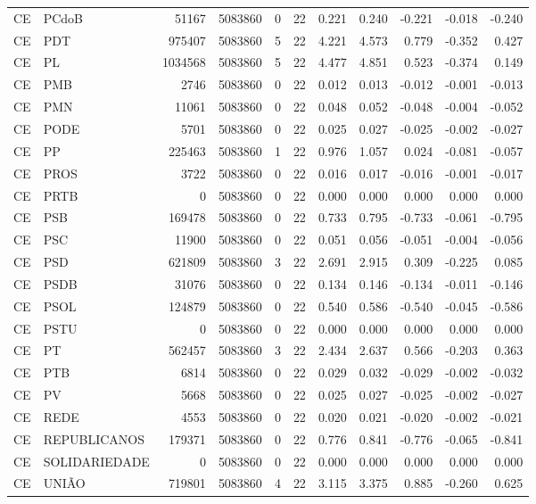 \begin{landscape}
\begin{longtable}{llrrrrrrrrr}
CE & PCdoB & 51167 & 5083860 & 0 & 22 & 0.221 & 0.240 & -0.221 & -0.018 & -0.240 \\
CE & PDT & 975407 & 5083860 & 5 & 22 & 4.221 & 4.573 & 0.779 & -0.352 & 0.427 \\
CE & PL & 1034568 & 5083860 & 5 & 22 & 4.477 & 4.851 & 0.523 & -0.374 & 0.149 \\
CE & PMB & 2746 & 5083860 & 0 & 22 & 0.012 & 0.013 & -0.012 & -0.001 & -0.013 \\
CE & PMN & 11061 & 5083860 & 0 & 22 & 0.048 & 0.052 & -0.048 & -0.004 & -0.052 \\
CE & PODE & 5701 & 5083860 & 0 & 22 & 0.025 & 0.027 & -0.025 & -0.002 & -0.027 \\
CE & PP & 225463 & 5083860 & 1 & 22 & 0.976 & 1.057 & 0.024 & -0.081 & -0.057 \\
CE & PROS & 3722 & 5083860 & 0 & 22 & 0.016 & 0.017 & -0.016 & -0.001 & -0.017 \\
CE & PRTB & 0 & 5083860 & 0 & 22 & 0.000 & 0.000 & 0.000 & 0.000 & 0.000 \\
CE & PSB & 169478 & 5083860 & 0 & 22 & 0.733 & 0.795 & -0.733 & -0.061 & -0.795 \\
CE & PSC & 11900 & 5083860 & 0 & 22 & 0.051 & 0.056 & -0.051 & -0.004 & -0.056 \\
CE & PSD & 621809 & 5083860 & 3 & 22 & 2.691 & 2.915 & 0.309 & -0.225 & 0.085 \\
CE & PSDB & 31076 & 5083860 & 0 & 22 & 0.134 & 0.146 & -0.134 & -0.011 & -0.146 \\
CE & PSOL & 124879 & 5083860 & 0 & 22 & 0.540 & 0.586 & -0.540 & -0.045 & -0.586 \\
CE & PSTU & 0 & 5083860 & 0 & 22 & 0.000 & 0.000 & 0.000 & 0.000 & 0.000 \\
CE & PT & 562457 & 5083860 & 3 & 22 & 2.434 & 2.637 & 0.566 & -0.203 & 0.363 \\
CE & PTB & 6814 & 5083860 & 0 & 22 & 0.029 & 0.032 & -0.029 & -0.002 & -0.032 \\
CE & PV & 5668 & 5083860 & 0 & 22 & 0.025 & 0.027 & -0.025 & -0.002 & -0.027 \\
CE & REDE & 4553 & 5083860 & 0 & 22 & 0.020 & 0.021 & -0.020 & -0.002 & -0.021 \\
CE & REPUBLICANOS & 179371 & 5083860 & 0 & 22 & 0.776 & 0.841 & -0.776 & -0.065 & -0.841 \\
CE & SOLIDARIEDADE & 0 & 5083860 & 0 & 22 & 0.000 & 0.000 & 0.000 & 0.000 & 0.000 \\
CE & UNIÃO & 719801 & 5083860 & 4 & 22 & 3.115 & 3.375 & 0.885 & -0.260 & 0.625 \\

\end{longtable}
\end{landscape}
